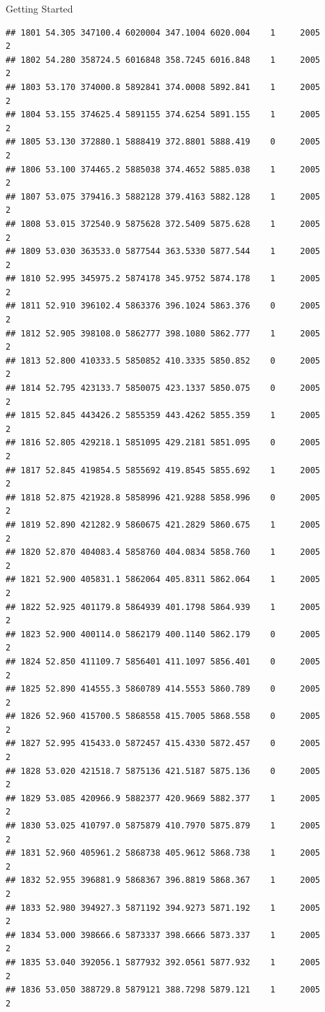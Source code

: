 \documentclass[
  ignorenonframetext,
]{beamer}
\begin{document}
\begin{frame}[fragile]{Getting Started}
\begin{verbatim}
## 1801 54.305 347100.4 6020004 347.1004 6020.004    1     2005        2
## 1802 54.280 358724.5 6016848 358.7245 6016.848    1     2005        2
## 1803 53.170 374000.8 5892841 374.0008 5892.841    1     2005        2
## 1804 53.155 374625.4 5891155 374.6254 5891.155    1     2005        2
## 1805 53.130 372880.1 5888419 372.8801 5888.419    0     2005        2
## 1806 53.100 374465.2 5885038 374.4652 5885.038    1     2005        2
## 1807 53.075 379416.3 5882128 379.4163 5882.128    1     2005        2
## 1808 53.015 372540.9 5875628 372.5409 5875.628    1     2005        2
## 1809 53.030 363533.0 5877544 363.5330 5877.544    1     2005        2
## 1810 52.995 345975.2 5874178 345.9752 5874.178    1     2005        2
## 1811 52.910 396102.4 5863376 396.1024 5863.376    0     2005        2
## 1812 52.905 398108.0 5862777 398.1080 5862.777    1     2005        2
## 1813 52.800 410333.5 5850852 410.3335 5850.852    0     2005        2
## 1814 52.795 423133.7 5850075 423.1337 5850.075    0     2005        2
## 1815 52.845 443426.2 5855359 443.4262 5855.359    1     2005        2
## 1816 52.805 429218.1 5851095 429.2181 5851.095    0     2005        2
## 1817 52.845 419854.5 5855692 419.8545 5855.692    1     2005        2
## 1818 52.875 421928.8 5858996 421.9288 5858.996    0     2005        2
## 1819 52.890 421282.9 5860675 421.2829 5860.675    1     2005        2
## 1820 52.870 404083.4 5858760 404.0834 5858.760    1     2005        2
## 1821 52.900 405831.1 5862064 405.8311 5862.064    1     2005        2
## 1822 52.925 401179.8 5864939 401.1798 5864.939    1     2005        2
## 1823 52.900 400114.0 5862179 400.1140 5862.179    0     2005        2
## 1824 52.850 411109.7 5856401 411.1097 5856.401    0     2005        2
## 1825 52.890 414555.3 5860789 414.5553 5860.789    0     2005        2
## 1826 52.960 415700.5 5868558 415.7005 5868.558    0     2005        2
## 1827 52.995 415433.0 5872457 415.4330 5872.457    0     2005        2
## 1828 53.020 421518.7 5875136 421.5187 5875.136    0     2005        2
## 1829 53.085 420966.9 5882377 420.9669 5882.377    1     2005        2
## 1830 53.025 410797.0 5875879 410.7970 5875.879    1     2005        2
## 1831 52.960 405961.2 5868738 405.9612 5868.738    1     2005        2
## 1832 52.955 396881.9 5868367 396.8819 5868.367    1     2005        2
## 1833 52.980 394927.3 5871192 394.9273 5871.192    1     2005        2
## 1834 53.000 398666.6 5873337 398.6666 5873.337    1     2005        2
## 1835 53.040 392056.1 5877932 392.0561 5877.932    1     2005        2
## 1836 53.050 388729.8 5879121 388.7298 5879.121    1     2005        2

\end{verbatim}
\end{frame}
\end{document}
